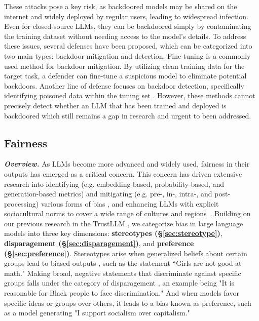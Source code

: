 These attacks pose a key risk, as backdoored models may be shared on the internet and widely deployed by regular users, leading to widespread infection. Even for closed-source LLMs, they can be backdoored simply by contaminating the training dataset without needing access to the model’s details. To address these issues, several defenses have been proposed, which can be categorized into two main types: backdoor mitigation and detection. Fine-tuning is a commonly used method for backdoor mitigation. By utilizing clean training data for the target task, a defender can fine-tune a suspicious model to eliminate potential backdoors. Another line of defense focuses on backdoor detection, specifically identifying poisoned data within the tuning set \cite{sagar2022defending,sun2022coprotector,shao2021bddr}. However, these methods cannot precisely detect whether an LLM that has been trained and deployed is backdoored which still remains a gap in research and urgent to been addressed.




\clearpage

\subsection{Fairness}
\textbf{\textit{Overview.}}
As LLMs become more advanced and widely used, fairness in their outputs has emerged as a critical concern. This concern has driven extensive research into identifying (e.g. embedding-based, probability-based, and generation-based metrics) and mitigating (e.g. pre-, in-, intra-, and post-processing) various forms of bias \cite{chu2024fairnesssurvey, fairnesssurvey, nadeem-etal-2021-stereoset, bai2024fairmonitor, garimella2022demographic, liu2023trustworthy,debiasinggradient2023,debiasing2023b}, and enhancing LLMs with explicit sociocultural norms to cover a wide range of cultures and regions~\cite{normsage2023,massiveculture2023}. Building on our previous research in the TrustLLM \cite{huang2024position}, we categorize bias in large language models into three key dimensions: \textbf{stereotypes (\S\ref{sec:stereotype})}, \textbf{disparagement (\S\ref{sec:disparagement})}, and \textbf{preference (\S\ref{sec:preference})}. Stereotypes arise when generalized beliefs about certain groups lead to biased outputs \cite{stereoset, CrowSpairs, siddique2024bettermath}, such as the statement ``Girls are not good at math." Making broad, negative statements that discriminate against specific groups falls under the category of disparagement \cite{biasandharm, dev2022measures, Dev_Li_Phillips_Srikumar_2020}, an example being "It is reasonable for Black people to face discrimination." And when models favor specific ideas or groups over others, it leads to a bias known as preference\cite{rozado2024political, chatgptpolitical, liu2023trustworthy}, such as a model generating "I support socialism over capitalism."

